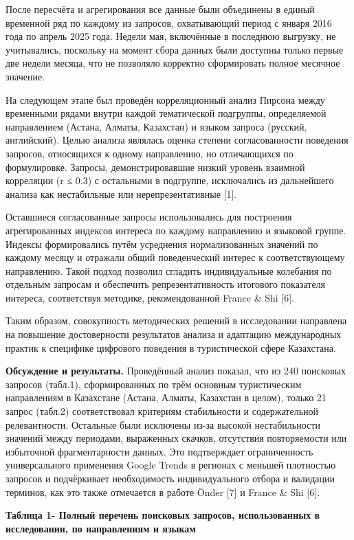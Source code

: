 После пересчёта и агрегирования все данные были объединены в единый
временной ряд по каждому из запросов, охватывающий период с января 2016
года по апрель 2025 года. Недели мая, включённые в последнюю выгрузку,
не учитывались, поскольку на момент сбора данных были доступны только
первые две недели месяца, что не позволяло корректно сформировать полное
месячное значение.

На следующем этапе был проведён корреляционный анализ Пирсона между
временными рядами внутри каждой тематической подгруппы, определяемой
направлением (Астана, Алматы, Казахстан) и языком запроса (русский,
английский). Целью анализа являлась оценка степени согласованности
поведения запросов, относящихся к одному направлению, но отличающихся по
формулировке. Запросы, демонстрировавшие низкий уровень взаимной
корреляции (r ≤ 0.3) с остальными в подгруппе, исключались из
дальнейшего анализа как нестабильные или нерепрезентативные {[}1{]}.

Оставшиеся согласованные запросы использовались для построения
агрегированных индексов интереса по каждому направлению и языковой
группе. Индексы формировались путём усреднения нормализованных значений
по каждому месяцу и отражали общий поведенческий интерес к
соответствующему направлению. Такой подход позволил сгладить
индивидуальные колебания по отдельным запросам и обеспечить
репрезентативность итогового показателя интереса, соответствуя методике,
рекомендованной France \& Shi {[}6{]}.

Таким образом, совокупность методических решений в исследовании
направлена на повышение достоверности результатов анализа и адаптацию
международных практик к специфике цифрового поведения в туристической
сфере Казахстана.

{\bfseries Обсуждение и результаты.} Проведённый анализ показал, что из 240
поисковых запросов (табл.1), сформированных по трём основным
туристическим направлениям в Казахстане (Астана, Алматы, Казахстан в
целом), только 21 запрос (табл.2) соответствовал критериям стабильности
и содержательной релевантности. Остальные были исключены из-за высокой
нестабильности значений между периодами, выраженных скачков, отсутствия
повторяемости или избыточной фрагментарности данных. Это подтверждает
ограниченность универсального применения Google Trends в регионах с
меньшей плотностью запросов и подчёркивает необходимость индивидуального
отбора и валидации терминов, как это также отмечается в работе Önder
{[}7{]} и France \& Shi {[}6{]}.

{\bfseries Таблица 1- Полный перечень поисковых запросов, использованных в
исследовании, по направлениям и языкам}

